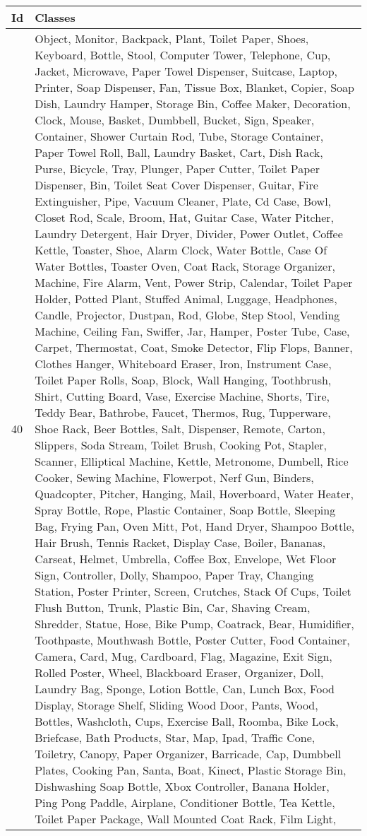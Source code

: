     \begin{table}
    	\begin{center}
    		\begin{tabular}{ | l | p{17cm} |}
    			\hline
    			
    			\cellcolor{purple!30}Id & \cellcolor{purple!30}Classes \\ \hline
    			
    			40 & Object, Monitor, Backpack, Plant, Toilet Paper, Shoes, Keyboard, Bottle, Stool, Computer Tower, Telephone, Cup, Jacket, Microwave, Paper Towel Dispenser, Suitcase, Laptop, Printer, Soap Dispenser, Fan, Tissue Box, Blanket, Copier, Soap Dish, Laundry Hamper, Storage Bin, Coffee Maker, Decoration, Clock, Mouse, Basket, Dumbbell, Bucket, Sign, Speaker, Container, Shower Curtain Rod, Tube, Storage Container, Paper Towel Roll, Ball, Laundry Basket, Cart, Dish Rack, Purse, Bicycle, Tray, Plunger, Paper Cutter, Toilet Paper Dispenser, Bin, Toilet Seat Cover Dispenser, Guitar, Fire Extinguisher, Pipe, Vacuum Cleaner, Plate, Cd Case, Bowl, Closet Rod, Scale, Broom, Hat, Guitar Case, Water Pitcher, Laundry Detergent, Hair Dryer, Divider, Power Outlet, Coffee Kettle, Toaster, Shoe, Alarm Clock, Water Bottle, Case Of Water Bottles, Toaster Oven, Coat Rack, Storage Organizer, Machine, Fire Alarm, Vent, Power Strip, Calendar, Toilet Paper Holder, Potted Plant, Stuffed Animal, Luggage, Headphones, Candle, Projector, Dustpan, Rod, Globe, Step Stool, Vending Machine, Ceiling Fan, Swiffer, Jar, Hamper, Poster Tube, Case, Carpet, Thermostat, Coat, Smoke Detector, Flip Flops, Banner, Clothes Hanger, Whiteboard Eraser, Iron, Instrument Case, Toilet Paper Rolls, Soap, Block, Wall Hanging, Toothbrush, Shirt, Cutting Board, Vase, Exercise Machine, Shorts, Tire, Teddy Bear, Bathrobe, Faucet, Thermos, Rug, Tupperware, Shoe Rack, Beer Bottles, Salt, Dispenser, Remote, Carton, Slippers, Soda Stream, Toilet Brush, Cooking Pot, Stapler, Scanner, Elliptical Machine, Kettle, Metronome, Dumbell, Rice Cooker, Sewing Machine, Flowerpot, Nerf Gun, Binders, Quadcopter, Pitcher, Hanging, Mail, Hoverboard, Water Heater, Spray Bottle, Rope, Plastic Container, Soap Bottle, Sleeping Bag, Frying Pan, Oven Mitt, Pot, Hand Dryer, Shampoo Bottle, Hair Brush, Tennis Racket, Display Case, Boiler, Bananas, Carseat, Helmet, Umbrella, Coffee Box, Envelope, Wet Floor Sign, Controller, Dolly, Shampoo, Paper Tray, Changing Station, Poster Printer, Screen, Crutches, Stack Of Cups, Toilet Flush Button, Trunk, Plastic Bin, Car, Shaving Cream, Shredder, Statue, Hose, Bike Pump, Coatrack, Bear, Humidifier, Toothpaste, Mouthwash Bottle, Poster Cutter, Food Container, Camera, Card, Mug, Cardboard, Flag, Magazine, Exit Sign, Rolled Poster, Wheel, Blackboard Eraser, Organizer, Doll, Laundry Bag, Sponge, Lotion Bottle, Can, Lunch Box, Food Display, Storage Shelf, Sliding Wood Door, Pants, Wood, Bottles, Washcloth, Cups, Exercise Ball, Roomba, Bike Lock, Briefcase, Bath Products, Star, Map, Ipad, Traffic Cone, Toiletry, Canopy, Paper Organizer, Barricade, Cap, Dumbbell Plates, Cooking Pan, Santa, Boat, Kinect, Plastic Storage Bin, Dishwashing Soap Bottle, Xbox Controller, Banana Holder, Ping Pong Paddle, Airplane, Conditioner Bottle, Tea Kettle, Toilet Paper Package, Wall Mounted Coat Rack, Film Light, 
\end{tabular}
\end{center}
\end{table}
